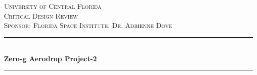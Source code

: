 \renewcommand{\baselinestretch}{1.5} 			%

\usepackage{pifont}                             %
\newcommand{\xmark}{\ding{55}}                  %

\usepackage{colortbl}                           %



\begin{titlepage}
{
\newcommand{\HRule}{\rule{\linewidth}{0.5mm}} %

\center %
 

\textsc{\LARGE University of Central Florida}\\[1.0cm] %
\textsc{\Large Critical Design Review}\\[0.5cm] %
\textsc{\large Sponsor: Florida Space Institute, Dr. Adrienne Dove}\\[0.5cm] %


\HRule \\[0.4cm]
{ \huge \bfseries  Zero-g Aerodrop Project-2 }\\[0.4cm] %
\HRule \\[1.5cm]
 

}
\end{titlepage}
